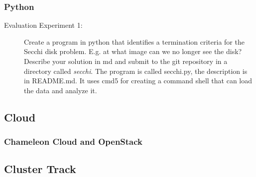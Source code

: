 \subsubsection{Python}




\begin{description}
\item[Evaluation Experiment 1:] Create a program in python that
  identifies a termination criteria for the Secchi disk
  problem. E.g. at what image can we no longer see the disk?
  Describe your solution in md and submit to the git repository in a
  directory called {\em secchi}. The program is called secchi.py, the
  description is in README.md. It uses cmd5 for creating a command
  shell that can load the data and analyze it. 
\end{description}

\subsection{Cloud}

\subsubsection{Chameleon Cloud and OpenStack}




\subsection{Cluster Track}

